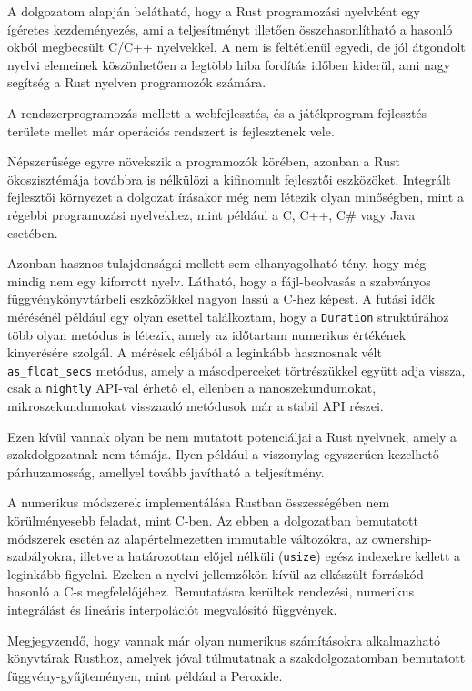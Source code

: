 A dolgozatom alapján belátható, hogy a Rust programozási nyelvként egy ígéretes kezdeményezés, ami a teljesítményt illetően összehasonlítható a hasonló okból megbecsült C/C++ nyelvekkel. A nem is feltétlenül egyedi, de jól átgondolt nyelvi elemeinek köszönhetően a legtöbb hiba fordítás időben kiderül, ami nagy segítség a Rust nyelven programozók számára.

A rendszerprogramozás mellett a webfejlesztés, és a játékprogram-fejlesztés területe mellet már operációs rendszert is fejlesztenek vele.

Népszerűsége egyre növekszik a programozók körében, azonban a Rust ökoszisztémája továbbra is nélkülözi a kifinomult fejlesztői eszközöket. Integrált fejlesztői környezet a dolgozat írásakor még nem létezik olyan minőségben, mint a régebbi programozási nyelvekhez, mint például a C, C++, C\# vagy Java esetében.

Azonban hasznos tulajdonságai mellett sem elhanyagolható tény, hogy még mindig nem egy kiforrott nyelv. Látható, hogy a fájl-beolvasás a szabványos függvénykönyvtárbeli eszközökkel nagyon lassú a C-hez képest. A futási idők mérésénél például egy olyan esettel találkoztam, hogy a \lstinline{Duration} struktúrához több olyan metódus is létezik, amely az időtartam numerikus értékének kinyerésére szolgál. A mérések céljából a leginkább hasznosnak vélt \lstinline{as_float_secs} metódus, amely a másodperceket törtrészükkel együtt adja vissza, csak a \lstinline{nightly} API-val érhető el, ellenben a nanoszekundumokat, mikroszekundumokat visszaadó metódusok már a stabil API részei.

Ezen kívül vannak olyan be nem mutatott potenciáljai a Rust nyelvnek, amely a szakdolgozatnak nem témája. Ilyen például a viszonylag egyszerűen kezelhető párhuzamosság, amellyel tovább javítható a teljesítmény.

A numerikus módszerek implementálása Rustban összességében nem körülményesebb feladat, mint C-ben. Az ebben a dolgozatban bemutatott módszerek esetén az alapértelmezetten immutable változókra, az ownership-szabályokra, illetve a határozottan előjel nélküli (\lstinline{usize}) egész indexekre kellett a leginkább figyelni. Ezeken a nyelvi jellemzőkön kívül az elkészült forráskód hasonló a C-s megfelelőjéhez. Bemutatásra kerültek rendezési, numerikus integrálást és lineáris interpolációt megvalósító függvények.

Megjegyzendő, hogy vannak már olyan numerikus számításokra alkalmazható könyvtárak Rusthoz, amelyek jóval túlmutatnak a szakdolgozatomban bemutatott függvény-gyűjteményen, mint például a Peroxide.


